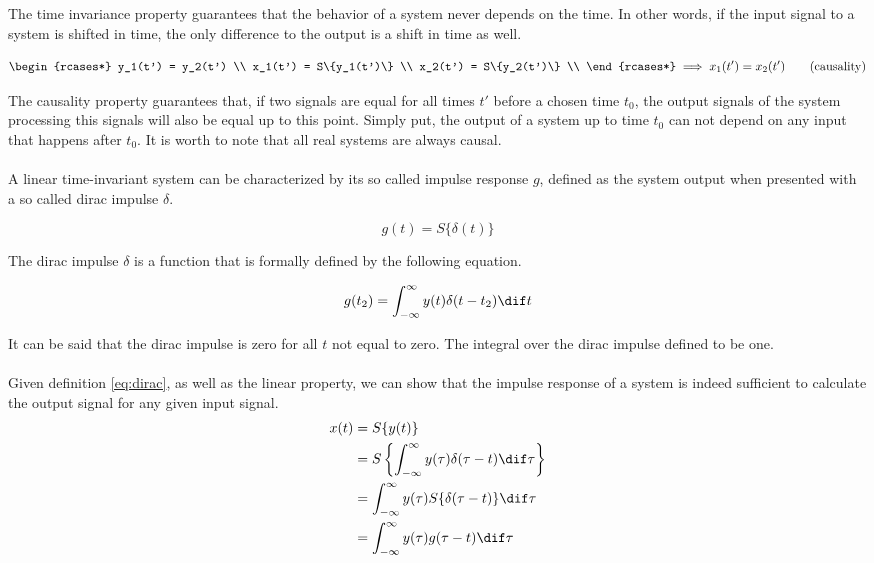 The time invariance property guarantees that the behavior of a system never depends on the time. In other words, if the input signal to a system is shifted in time, the only difference to the output is a shift in time as well.

\[
\begin{rcases*}
y_1(t') = y_2(t') \\
x_1(t') = S\{y_1(t')\} \\ 
x_2(t') = S\{y_2(t')\} \\
\end{rcases*} \implies x_1(t') = x_2(t') \tag{causality}\]

The causality property guarantees that, if two signals are equal for all times $t'$ before a chosen time $t_0$, the output signals of the system processing this signals will also be equal up to this point. Simply put, the output of a system up to time $t_0$ can not depend on any input that happens after $t_0$. It is worth to note that all real systems are always causal. 
\\ \\
A linear time-invariant system can be characterized by its so called impulse response $g$, defined as the system output when presented with a so called dirac impulse $\delta$.

\[g(t) = S\{\delta(t)\}\]

The dirac impulse $\delta$ is a function that is formally defined by the following equation. 

\begin{align}
g(t_2) = \int_{-\infty}^{\infty} y(t)\delta(t - t_2) \dif t \label{eq:dirac} 
\end{align}

It can be said that the dirac impulse is zero for all $t$ not equal to zero. The integral over the dirac impulse defined to be one. 
\\ \\
Given definition \ref{eq:dirac}, as well as the linear property, we can show that the impulse response of a system is indeed sufficient to calculate the output signal for any given input signal. 
\begin{align*}
x(t) &= S\{y(t)\} \\
	 &= S\left\{\int_{-\infty}^{\infty} y(\tau)\delta(\tau - t) \dif\tau \right\} \\
	 &= \int_{-\infty}^{\infty} y(\tau)S\{\delta(\tau - t)\} \dif\tau \\
	 &= \int_{-\infty}^{\infty} y(\tau)g(\tau - t) \dif\tau
\end{align*}

